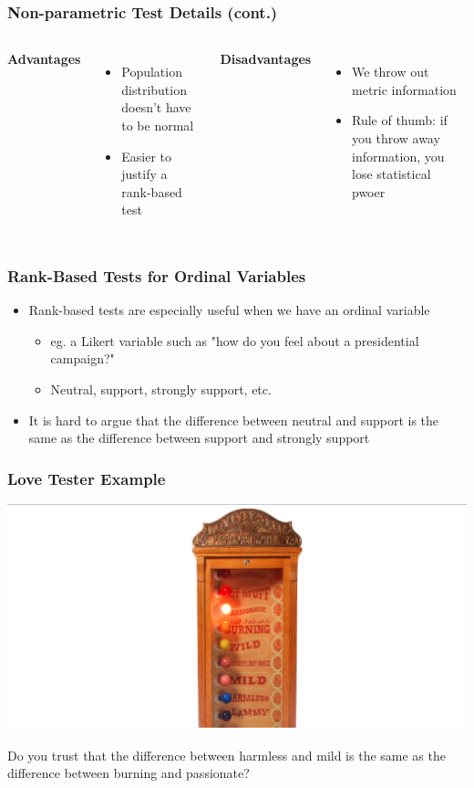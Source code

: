 \documentclass[12pt, block=fill]{beamer}
\begin{document}
\begin{frame}
  \frametitle{Non-parametric Test Details (cont.)}
  \begin{columns}
    \textbf{Advantages}
    \begin{itemize}
        \item Population distribution doesn't have to be normal
        \item Easier to justify a rank-based test
    \end{itemize}
    
    \textbf{Disadvantages}
    \begin{itemize}
        \item We throw out metric information
        \item Rule of thumb: if you throw away information, you lose statistical pwoer
    \end{itemize}
  \end{columns}
    
\end{frame}


\begin{frame}
  \frametitle{Rank-Based Tests for Ordinal Variables}
  \begin{itemize}
      \item Rank-based tests are especially useful when we have an ordinal variable 
      \begin{itemize}
          \item eg. a Likert variable such as "how do you feel about a presidential campaign?"
          \item Neutral, support, strongly support, etc.
      \end{itemize} 
      \item It is hard to argue that the difference between neutral and support is the same as the difference between support and strongly support
  \end{itemize}
    
\end{frame}


\begin{frame}
  \frametitle{Love Tester Example}
  
  \includegraphics[width=1.0\textwidth]{figures/love_tester.png}

  Do you trust that the difference between harmless and mild is the same as the difference between burning and passionate?
    
\end{frame}
\end{document}
